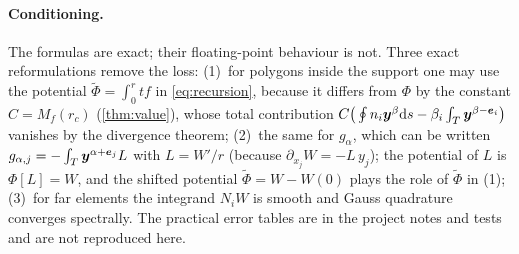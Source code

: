 \paragraph{Conditioning.} The formulas are exact; their floating-point behaviour is not. Three exact
reformulations remove the loss: (1)~for polygons inside the support one may use the potential
$\tilde\Phi=\int_0^rtf$ in \eqref{eq:recursion}, because it differs from $\Phi$ by the constant $C=M_f(r_c)$ (\cref{thm:value}), whose total contribution
$C\big(\oint n_i\bm y^\beta\mathrm{d} s-\beta_i\int_T\bm y^{\beta-\bm e_i}\big)$ vanishes by the divergence theorem; (2)~the same for $g_\alpha$, which can be written $g_{\alpha,j}=-\int_T\bm y^{\alpha+\bm e_j}L$ with $L=W'/r$
(because $\partial_{x_j}W=-L\,y_j$); the potential of $L$ is $\Phi[L]=W$, and the shifted potential $\tilde\Phi=W-W(0)$ plays the role of $\tilde\Phi$ in (1); (3)~for far elements the integrand $N_iW$ is smooth and Gauss quadrature converges
spectrally. The practical error tables are in the project notes and tests and are not reproduced here. 
